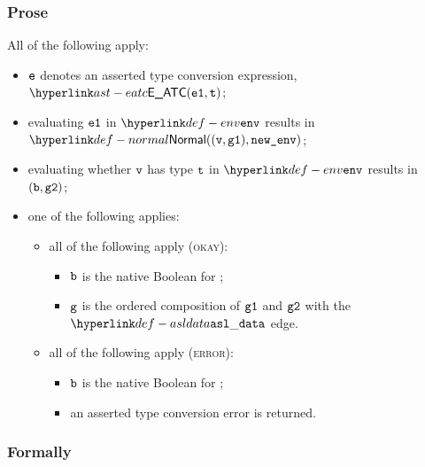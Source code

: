 \subsubsection{Prose}
All of the following apply:
\begin{itemize}
\item $\texttt{e}$ denotes an asserted type conversion expression, $\EATC(\veone, \vt)$;
\item evaluating $\texttt{e1}$ in $\env$ results in $\Normal((\vv, \vgone), \newenv)$\ProseOrAbnormal;
\item evaluating whether $\texttt{v}$ has type $\texttt{t}$ in $\env$ results in $(\texttt{b}, \texttt{g2})$\ProseTerminateAs{\DynErrorConfig};
\item one of the following applies:
      \begin{itemize}
      \item all of the following apply (\textsc{okay}):
            \begin{itemize}
            \item $\texttt{b}$ is the native Boolean for \True;
            \item $\texttt{g}$ is the ordered composition of $\texttt{g1}$ and $\texttt{g2}$ with the $\asldata$ edge.
            \end{itemize}
      \item all of the following apply (\textsc{error}):
            \begin{itemize}
            \item $\texttt{b}$ is the native Boolean for \True;
            \item an asserted type conversion error is returned.
            \end{itemize}
      \end{itemize}
\end{itemize}
\subsubsection{Formally}

